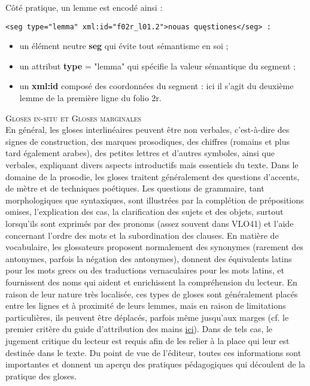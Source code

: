 \documentclass[a4paper, twoside, 12pt]{book}
\begin{document}
Côté pratique, un lemme est encodé ainsi :

\begin{verbatim} 
<seg type="lemma" xml:id="f02r_l01.2">nouas quęstiones</seg> :
\end{verbatim}

\begin{itemize}
    \item un élément neutre \textbf{seg} qui évite tout sémantisme en soi ;
    \item un attribut \textbf{type} = "lemma" qui spécifie la valeur sémantique du segment ;
    \item un \textbf{xml:id} composé des coordonnées du segment : ici il s'agit du deuxième lemme de la première ligne du folio 2r.
\end{itemize}

\textsc{Gloses in-situ et Gloses marginales}\\

En général, les gloses interlinéaires peuvent être non verbales, c'est-à-dire des signes de construction, des marques prosodiques, des chiffres (romains et plus tard également arabes), des petites lettres et d'autres symboles, ainsi que verbales, expliquant divers aspects introductifs mais essentiels du texte. Dans le domaine de la prosodie, les gloses traitent généralement des questions d'accents, de mètre et de techniques poétiques. Les questions de grammaire, tant morphologiques que syntaxiques, sont illustrées par la complétion de prépositions omises, l'explication des cas, la clarification des sujets et des objets, surtout lorsqu'ils sont exprimés par des pronoms (assez souvent dans VLO41) et l'aide concernant l'ordre des mots et la subordination des clauses. En matière de vocabulaire, les glossateurs proposent normalement des synonymes (rarement des antonymes, parfois la négation des antonymes), donnent des équivalents latins pour les mots grecs ou des traductions vernaculaires pour les mots latins, et fournissent des noms qui aident et enrichissent la compréhension du lecteur. En raison de leur nature très localisée, ces types de gloses sont généralement placés entre les lignes et à proximité de leurs lemmes, mais en raison de limitations particulières, ils peuvent être déplacés, parfois même jusqu'aux marges (cf. le premier critère du guide d'attribution des mains \href{https://github.com/malamatenia/Eutychès/blob/main/hand_attribution_guide.pdf}{ici}). Dans de tels cas, le jugement critique du lecteur est requis afin de les relier à la place qui leur est destinée dans le texte. Du point de vue de l'éditeur, toutes ces informations sont importantes et donnent un aperçu des pratiques pédagogiques qui découlent de la pratique des gloses.\\
\end{document}
